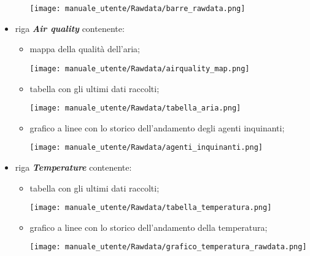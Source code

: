 \begin{itemize}
\begin{itemize}
\begin{center}
            \texttt{[image: manuale\_utente/Rawdata/barre\_rawdata.png]}
        \end{center} 
    \end{itemize}
    \newpage
    \item riga \textit{\textbf{Air quality}} contenente:
    \begin{itemize}
        \item mappa della qualità dell'aria;
        \begin{center}
            \texttt{[image: manuale\_utente/Rawdata/airquality\_map.png]}
        \end{center}
        \item tabella con gli ultimi dati raccolti;
        \begin{center}
            \texttt{[image: manuale\_utente/Rawdata/tabella\_aria.png]}
        \end{center}
        \item grafico a linee con lo storico dell'andamento degli agenti inquinanti;
        \begin{center}
            \texttt{[image: manuale\_utente/Rawdata/agenti\_inquinanti.png]}
        \end{center}
    \end{itemize}
    \item riga \textit{\textbf{Temperature}} contenente:
    \begin{itemize}
        \item tabella con gli ultimi dati raccolti;
        \begin{center}
            \texttt{[image: manuale\_utente/Rawdata/tabella\_temperatura.png]}
        \end{center}
        \item grafico a linee con lo storico dell'andamento della temperatura;
        \begin{center}
            \texttt{[image: manuale\_utente/Rawdata/grafico\_temperatura\_rawdata.png]}
        \end{center}

\end{itemize}
\end{itemize}
